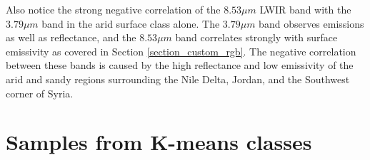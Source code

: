 \documentclass[12pt]{article}
\begin{document}
Also notice the strong negative correlation of the $8.53\mu m$ LWIR band with the $3.79\mu m$ band in the arid surface class alone. The $3.79\mu m$ band observes emissions as well as reflectance, and the $8.53\mu m$ band correlates strongly with surface emissivity as covered in Section \ref{section_custom_rgb}. The negative correlation between these bands is caused by the high reflectance and low emissivity of the arid and sandy regions surrounding the Nile Delta, Jordan, and the Southwest corner of Syria.



\section{Samples from K-means classes}\label{section_samples_km}

\begin{figure}[h!]
    \centering

    \begin{center}


\end{center}
\end{figure}
\end{document}
